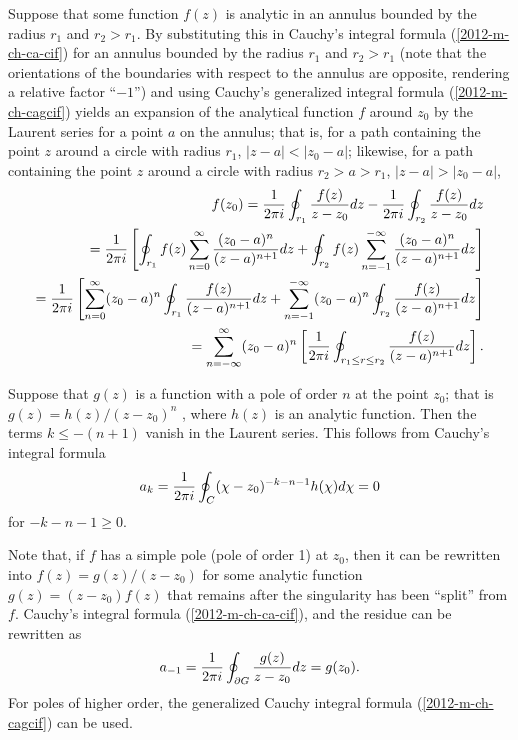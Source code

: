 {Suppose that some function $f(z)$ is analytic in an annulus bounded by the radius $r_1$ and $r_2 > r_1$.
By substituting this in
Cauchy's integral formula
(\ref{2012-m-ch-ca-cif})
for an annulus bounded by the radius $r_1$ and $r_2 > r_1$
(note that the orientations of the boundaries with respect to the annulus are opposite,
rendering a relative factor ``$-1$'')
and using
Cauchy's generalized integral formula
(\ref{2012-m-ch-cagcif})
yields an expansion of the analytical function $f$ around $z_0$ by the Laurent series
for a point $a$ on the annulus; that is,
for a path  containing the point $z$ around a circle with radius
$r_1$, $|z - a| < |z_0 - a|$;
likewise,
for a path  containing the point $z$ around a circle with radius
$r_2 > a > r_1$, $|z - a| > |z_0 - a|$,
\begin{equation}
\begin{split}
f(z_0)=
{1\over 2\pi i}\oint_{r_1}{f(z)\over z-z_0}dz
-
{1\over 2\pi i}\oint_{r_2}{f(z)\over z-z_0}dz
\\
=
{1\over 2\pi i}\left[
\oint_{r_1} f(z) \sum_{n=0}^\infty \frac{ (z_0 - a)^n }{ (z - a)^{n+1}} dz
+
\oint_{r_2} f(z) \sum_{n=-1}^{-\infty} \frac{ (z_0 - a)^n }{ (z - a)^{n+1}} dz
\right]
\\
=
{1\over 2\pi i}\left[
\sum_{n=0}^\infty (z_0 - a)^n  \oint_{r_1}   \frac{  f(z) }{ (z - a)^{n+1}} dz
+
\sum_{n=-1}^{-\infty} (z_0 - a)^n \oint_{r_2} \frac{ f(z) }{ (z - a)^{n+1}} dz
\right]
\\
=
\sum_{n = -\infty}^\infty (z_0 - a)^n  \left[ {1\over 2\pi i} \oint_{r_1\le r \le r_2} \frac{ f(z) }{ (z - a)^{n+1}}  dz \right] .
\end{split}
\label{2012-m-ch-ca-ssolutlarent}
\end{equation}

\eproof
}

Suppose that  $g(z)$ is a function with a pole of order $n$ at the point
 $z_0$; that is
 $g(z)= {h(z)/ (z-z_0)^n}$ ,
where $h(z)$ is an analytic function. Then the terms  $k\le -(n+1)$
vanish in the Laurent series.
This follows from  Cauchy's integral formula
\begin{equation}
a_k ={1\over 2\pi i}\oint_C(\chi -z_0)^{-k-n-1}h(\chi )d\chi =0
\end{equation}
 for $-k-n-1\ge 0$.

Note that, if $f$ has a simple pole (pole of order 1) at $z_0$,
then it can be rewritten into $f(z)=g(z)/(z-z_0)$ for some analytic function $g(z)=(z-z_0) f(z)$
that remains after the singularity has been ``split'' from $f$.
Cauchy's integral formula (\ref{2012-m-ch-ca-cif}),
and the residue can be rewritten as
\begin{equation}
a_{-1}={1\over 2\pi i}
\oint_{\partial G}{g(z)\over z-z_0}dz =
g(z_0)
 .
\label{2012-m-ch-ca-cif1}
\end{equation}
For poles of higher order, the generalized Cauchy integral formula
(\ref{2012-m-ch-cagcif}) can be used.

